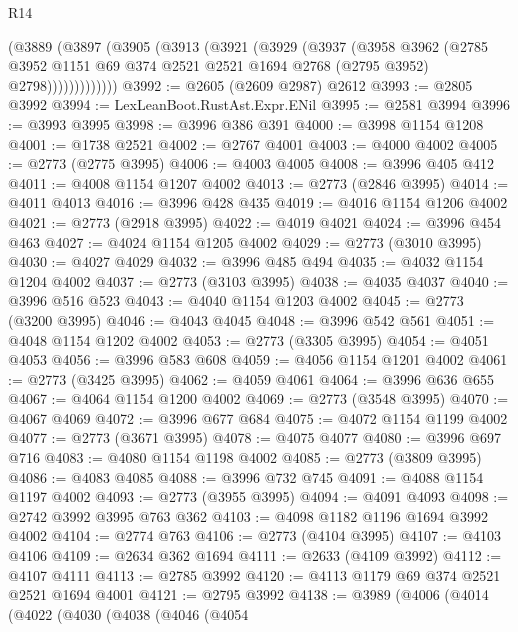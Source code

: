 \begin{lexlean}{R14}
\begin{coremodule}
            (@3889
              (@3897
                (@3905
                  (@3913
                    (@3921
                      (@3929
                        (@3937
                          (@3958
                            @3962
                            (@2785
                              @3952
                              @1151
                              @69
                              @374
                              @2521
                              @2521
                              @1694
                              @2768
                              (@2795 @3952)
                              @2798)))))))))))))
@3992 := @2605 (@2609 @2987) @2612
@3993 := @2805 @3992
@3994 := LexLeanBoot.RustAst.Expr.ENil
@3995 := @2581 @3994
@3996 := @3993 @3995
@3998 := @3996 @386 @391
@4000 := @3998 @1154 @1208
@4001 := @1738 @2521
@4002 := @2767 @4001
@4003 := @4000 @4002
@4005 := @2773 (@2775 @3995)
@4006 := @4003 @4005
@4008 := @3996 @405 @412
@4011 := @4008 @1154 @1207 @4002
@4013 := @2773 (@2846 @3995)
@4014 := @4011 @4013
@4016 := @3996 @428 @435
@4019 := @4016 @1154 @1206 @4002
@4021 := @2773 (@2918 @3995)
@4022 := @4019 @4021
@4024 := @3996 @454 @463
@4027 := @4024 @1154 @1205 @4002
@4029 := @2773 (@3010 @3995)
@4030 := @4027 @4029
@4032 := @3996 @485 @494
@4035 := @4032 @1154 @1204 @4002
@4037 := @2773 (@3103 @3995)
@4038 := @4035 @4037
@4040 := @3996 @516 @523
@4043 := @4040 @1154 @1203 @4002
@4045 := @2773 (@3200 @3995)
@4046 := @4043 @4045
@4048 := @3996 @542 @561
@4051 := @4048 @1154 @1202 @4002
@4053 := @2773 (@3305 @3995)
@4054 := @4051 @4053
@4056 := @3996 @583 @608
@4059 := @4056 @1154 @1201 @4002
@4061 := @2773 (@3425 @3995)
@4062 := @4059 @4061
@4064 := @3996 @636 @655
@4067 := @4064 @1154 @1200 @4002
@4069 := @2773 (@3548 @3995)
@4070 := @4067 @4069
@4072 := @3996 @677 @684
@4075 := @4072 @1154 @1199 @4002
@4077 := @2773 (@3671 @3995)
@4078 := @4075 @4077
@4080 := @3996 @697 @716
@4083 := @4080 @1154 @1198 @4002
@4085 := @2773 (@3809 @3995)
@4086 := @4083 @4085
@4088 := @3996 @732 @745
@4091 := @4088 @1154 @1197 @4002
@4093 := @2773 (@3955 @3995)
@4094 := @4091 @4093
@4098 := @2742 @3992 @3995 @763 @362
@4103 := @4098 @1182 @1196 @1694 @3992 @4002
@4104 := @2774 @763
@4106 := @2773 (@4104 @3995)
@4107 := @4103 @4106
@4109 := @2634 @362 @1694
@4111 := @2633 (@4109 @3992)
@4112 := @4107 @4111
@4113 := @2785 @3992
@4120 := @4113 @1179 @69 @374 @2521 @2521 @1694 @4001
@4121 := @2795 @3992
@4138 := @3989
    (@4006
      (@4014
        (@4022
          (@4030
            (@4038
              (@4046
                (@4054

\end{coremodule}
\end{lexlean}
